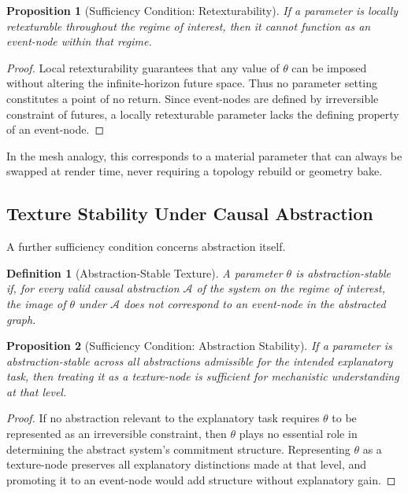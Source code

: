 \documentclass[11pt]{article}
\newtheorem{definition}{Definition}
\newtheorem{proposition}{Proposition}
\begin{document}
\begin{proposition}[Sufficiency Condition: Retexturability]
If a parameter is locally retexturable throughout the regime of interest, then
it cannot function as an event-node within that regime.
\end{proposition}

\begin{proof}
Local retexturability guarantees that any value of $\theta$ can be imposed
without altering the infinite-horizon future space. Thus no parameter setting
constitutes a point of no return. Since event-nodes are defined by irreversible
constraint of futures, a locally retexturable parameter lacks the defining
property of an event-node.
\end{proof}

In the mesh analogy, this corresponds to a material parameter that can always be
swapped at render time, never requiring a topology rebuild or geometry bake.

\subsection{Texture Stability Under Causal Abstraction}

A further sufficiency condition concerns abstraction itself.

\begin{definition}[Abstraction-Stable Texture]
A parameter $\theta$ is \emph{abstraction-stable} if, for every valid causal
abstraction $\mathcal{A}$ of the system on the regime of interest, the image of
$\theta$ under $\mathcal{A}$ does not correspond to an event-node in the
abstracted graph.
\end{definition}

\begin{proposition}[Sufficiency Condition: Abstraction Stability]
If a parameter is abstraction-stable across all abstractions admissible for the
intended explanatory task, then treating it as a texture-node is sufficient for
mechanistic understanding at that level.
\end{proposition}

\begin{proof}
If no abstraction relevant to the explanatory task requires $\theta$ to be
represented as an irreversible constraint, then $\theta$ plays no essential
role in determining the abstract system's commitment structure. Representing
$\theta$ as a texture-node preserves all explanatory distinctions made at that
level, and promoting it to an event-node would add structure without
explanatory gain.
\end{proof}
\end{document}

